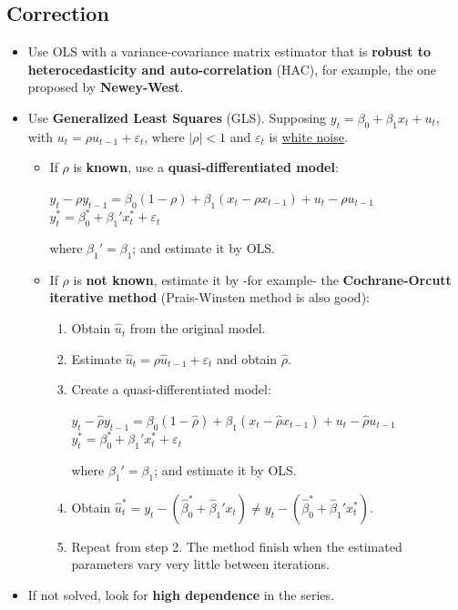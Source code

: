 \documentclass[10pt, a4paper, landscape]{extarticle}
\begin{document}
\begin{multicols}{3}
	\subsection*{Correction}
		\begin{itemize}[leftmargin=*]
			\item Use OLS with a variance-covariance matrix estimator that is \textbf{robust to heterocedasticity and auto-correlation} (HAC), for example, the one proposed by \textbf{Newey-West}.
			\item Use \textbf{Generalized Least Squares} (GLS). Supposing $y_t = \beta_0 + \beta_1 x_t + u_t$, with $u_t = \rho u_{t-1} + \varepsilon_t$, where $|\rho| < 1$ and $\varepsilon_t$ is \underline{white noise}.
			\begin{itemize}[leftmargin=*]
				\item If $\rho$ is \textbf{known}, use a \textbf{quasi-differentiated model}:
				\begin{center}
					$y_t - \rho y_{t-1} = \beta_0 (1 - \rho) + \beta_1 (x_t - \rho x_{t-1}) + u_t - \rho u_{t-1}$
					\ $y_t^* = \beta_0^* + \beta_1' x_t^* + \varepsilon_t$
				\end{center}
				where $\beta_1' = \beta_1$; and estimate it by OLS.
				\item If $\rho$ is \textbf{not known}, estimate it by -for example- the \textbf{Cochrane-Orcutt iterative method} (Prais-Winsten method is also good):
				\begin{enumerate}[leftmargin=*]
					\item Obtain $\hat{u}_t$ from the original model.
					\item Estimate $\hat{u}_t = \rho \hat{u}_{t-1} + \varepsilon_t$ and obtain $\hat{\rho}$.
					\item Create a quasi-differentiated model:
					\begin{center}
						$y_t - \hat{\rho} y_{t-1} = \beta_0 (1 - \hat{\rho}) + \beta_1 (x_t - \hat{\rho} x_{t-1}) + u_t - \hat{\rho} u_{t-1}$
						\ $y_t^* = \beta_0^* + \beta_1' x_t^* + \varepsilon_t$
					\end{center}
					where $\beta_1' = \beta_1$; and estimate it by OLS.
					\item Obtain $\hat{u}_t^* = y_t - (\hat{\beta}_0^* + \hat{\beta}_1' x_t) \neq y_t - (\hat{\beta}_0^* + \hat{\beta}_1' x_t^*)$.
					\item Repeat from step 2. The method finish when the estimated parameters vary very little between iterations.
				\end{enumerate}
			\end{itemize}
		\item If not solved, look for \textbf{high dependence} in the series.
		\end{itemize}


\end{multicols}
\end{document}
